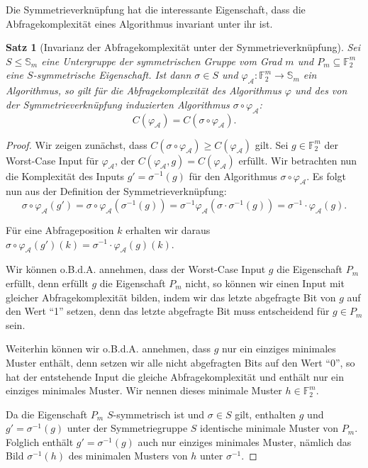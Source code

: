 \documentclass[10pt,a4paper, footheight=1mm, bibliography=totoc]{scrreprt}
\newtheorem{Satz}[definition]{Satz}
\theoremstyle{definition}
\begin{document}
Die Symmetrieverknüpfung hat die interessante Eigenschaft,
dass die Abfragekomplexität eines Algorithmus invariant unter
ihr ist.

\begin{Satz}[Invarianz der Abfragekomplexität unter der Symmetrieverknüpfung]
Sei $S\leq \mathbb{S}_m$ eine Untergruppe der symmetrischen Gruppe vom
Grad $m$ und $P_m \subseteq\mathbb{F}_2^m$ eine $S$-symmetrische
Eigenschaft. Ist dann $\sigma \in S$ und
$\varphi_\mathcal{A}:\mathbb{F}_2^m \to \mathbb{S}_m$ ein Algorithmus,
so gilt für die Abfragekomplexität des Algorithmus $\varphi$
und des von der Symmetrieverknüpfung induzierten Algorithmus
$\sigma \circ \varphi_\mathcal{A}$:
$$C(\varphi_\mathcal{A}) = C(\sigma \circ \varphi_\mathcal{A}).$$
\end{Satz}
\begin{proof}
Wir zeigen zunächst, dass 
$C(\sigma \circ \varphi_\mathcal{A}) \geq C(\varphi_\mathcal{A})$ gilt. 
Sei $g\in\mathbb{F}_2^m$ der Worst-Case Input für $\varphi_\mathcal{A}$,
der $C(\varphi_\mathcal{A}, g) = C(\varphi_\mathcal{A})$ erfüllt.
Wir betrachten nun die Komplexität des Inputs $g' = \sigma^{-1}(g)$
für den Algorithmus $\sigma \circ \varphi_\mathcal{A}$.
Es folgt nun aus der Definition der Symmetrieverknüpfung:
\begin{equation}
\label{eq:Symmetrie}
\sigma \circ \varphi_\mathcal{A} (g')
= \sigma \circ \varphi_\mathcal{A} (\sigma^{-1}(g)) 
= \sigma^{-1} \varphi_\mathcal{A}(\sigma \cdot \sigma^{-1} (g))
= \sigma^{-1} \cdot \varphi_\mathcal{A}(g).
\end{equation}

Für eine Abfrageposition $k$ erhalten wir daraus 
$\sigma \circ \varphi_\mathcal{A}(g')(k) 
= \sigma^{-1} \cdot \varphi_\mathcal{A}(g)(k)$.

Wir können o.B.d.A. annehmen, dass der Worst-Case Input $g$ die
Eigenschaft $P_m$ erfüllt, denn erfüllt $g$ die Eigenschaft
$P_m$ nicht, so können wir einen Input  mit gleicher
Abfragekomplexität bilden, indem wir das letzte abgefragte
Bit von $g$ auf den Wert "`1"' setzen, denn das letzte
abgefragte Bit muss entscheidend für $g\in P_m$ sein.

Weiterhin können wir o.B.d.A. annehmen, dass $g$ nur 
ein einziges minimales Muster enthält, denn setzen wir
alle nicht abgefragten Bits auf den Wert "`0"', so hat
der entstehende Input die gleiche Abfragekomplexität
und enthält nur ein einziges minimales Muster.
Wir nennen dieses minimale Muster $h\in \mathbb{F}_2^m$.

Da die Eigenschaft $P_m$ $S$-symmetrisch ist und 
$\sigma\in S$ gilt, enthalten $g$ und $g'=\sigma^{-1}(g)$
unter der Symmetriegruppe $S$ identische minimale Muster von $P_m$.
Folglich enthält $g'=\sigma^{-1}(g)$ auch nur einziges minimales Muster,
nämlich das Bild $\sigma^{-1}(h)$ des minimalen Musters von $h$ unter
$\sigma^{-1}$.


\end{proof}
\end{document}
